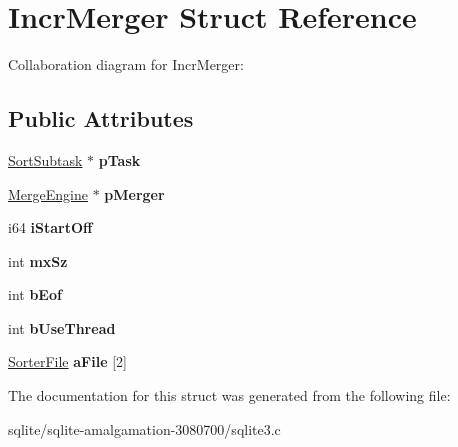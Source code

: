 \hypertarget{struct_incr_merger}{\section{Incr\+Merger Struct Reference}
\label{struct_incr_merger}
}


Collaboration diagram for Incr\+Merger\+:
\subsection*{Public Attributes}
\begin{DoxyCompactItemize}
\item 
\hypertarget{struct_incr_merger_a2b941a6bbca7d5c0fc0c0391c44eccda}{\hyperlink{struct_sort_subtask}{Sort\+Subtask} $\ast$ {\bfseries p\+Task}}\label{struct_incr_merger_a2b941a6bbca7d5c0fc0c0391c44eccda}

\item 
\hypertarget{struct_incr_merger_ac7335fe89a94112b63e206ac48656f4e}{\hyperlink{struct_merge_engine}{Merge\+Engine} $\ast$ {\bfseries p\+Merger}}\label{struct_incr_merger_ac7335fe89a94112b63e206ac48656f4e}

\item 
\hypertarget{struct_incr_merger_a88153aef88037ccac55eb5c9209a3e1b}{i64 {\bfseries i\+Start\+Off}}\label{struct_incr_merger_a88153aef88037ccac55eb5c9209a3e1b}

\item 
\hypertarget{struct_incr_merger_a333e98e9e5e951e2e00a109a95c4fbab}{int {\bfseries mx\+Sz}}\label{struct_incr_merger_a333e98e9e5e951e2e00a109a95c4fbab}

\item 
\hypertarget{struct_incr_merger_af9ebc9bf53d72441086d98e379ca2721}{int {\bfseries b\+Eof}}\label{struct_incr_merger_af9ebc9bf53d72441086d98e379ca2721}

\item 
\hypertarget{struct_incr_merger_a5c4a9d27ce78f3edaa91c5d85c0f3474}{int {\bfseries b\+Use\+Thread}}\label{struct_incr_merger_a5c4a9d27ce78f3edaa91c5d85c0f3474}

\item 
\hypertarget{struct_incr_merger_a276ff9bd9d3c7c9609cdfde70127bcc3}{\hyperlink{struct_sorter_file}{Sorter\+File} {\bfseries a\+File} \mbox{[}2\mbox{]}}\label{struct_incr_merger_a276ff9bd9d3c7c9609cdfde70127bcc3}

\end{DoxyCompactItemize}


The documentation for this struct was generated from the following file\+:\begin{DoxyCompactItemize}
\item 
sqlite/sqlite-\/amalgamation-\/3080700/sqlite3.\+c\end{DoxyCompactItemize}
